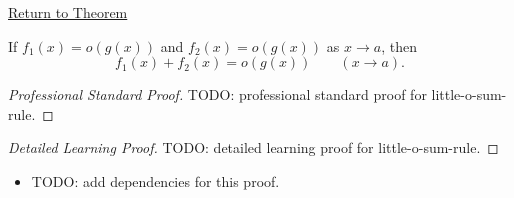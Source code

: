 \newpage
{}
\label{prf:little-o-sum-rule}

\begin{remark*}[Return]
\hyperref[prop:little-o-sum-rule]{Return to Theorem}
\end{remark*}

\begin{proposition*}
If $f_1(x)=o(g(x))$ and $f_2(x)=o(g(x))$ as $x\to a$, then
\[
  f_1(x)+f_2(x)=o(g(x))\qquad (x\to a).
\]
\end{proposition*}

\begin{proof}[Professional Standard Proof]
\LRAProofBodyStart
TODO: professional standard proof for little-o-sum-rule.
\end{proof}

\begin{proof}[Detailed Learning Proof]
\LRAProofBodyStart
TODO: detailed learning proof for little-o-sum-rule.
\end{proof}

\begin{remark*}
\end{remark*}

\begin{dependencies}
\begin{itemize}
  \item TODO: add dependencies for this proof.
\end{itemize}
\end{dependencies}

\clearpage
